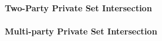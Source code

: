 \paragraph{Two-Party Private Set Intersection}




\paragraph{Multi-party Private Set Intersection}
